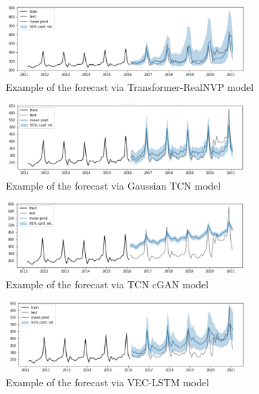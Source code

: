 \documentclass[12pt,a4paper]{article}
\begin{document}
\begin{figure}[h!]
    \centering
    \includegraphics[width=0.8\textwidth]{transformer_realnvp.png}
    \caption{Example of the forecast via Transformer-RealNVP model}
    \label{fig:transformer_realnvp}
\end{figure}

\begin{figure}[h!]
    \centering
    \includegraphics[width=0.8\textwidth]{gaussian_tcn.png}
    \caption{Example of the forecast via Gaussian TCN model}
    \label{fig:gaussian_tcn}
\end{figure}

\begin{figure}[h!]
    \centering
    \includegraphics[width=0.8\textwidth]{tcn_cgan.png}
    \caption{Example of the forecast via TCN cGAN model}
    \label{fig:tcn_cgan}
\end{figure}

\begin{figure}[h!]
    \centering
    \includegraphics[width=0.8\textwidth]{vec_lstm.png}
    \caption{Example of the forecast via VEC-LSTM model}
    \label{fig:vec_lstm}
\end{figure}
\end{document}
